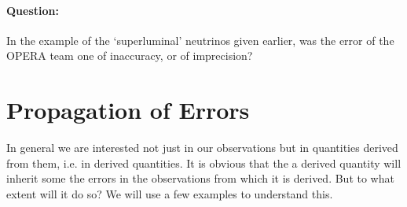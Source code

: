 \begin{question}
\paragraph{Question:} In the example of the `superluminal' neutrinos given earlier, was the error of the OPERA team one of inaccuracy, or of imprecision? 
\end{question}

\section{Propagation of Errors}

In general we are interested not just in our observations but in quantities derived from them, i.e. in derived quantities. It is obvious that the a derived quantity will inherit some the errors in the observations from which it is derived. But to what extent will it do so? We will use a few examples to understand this. 

